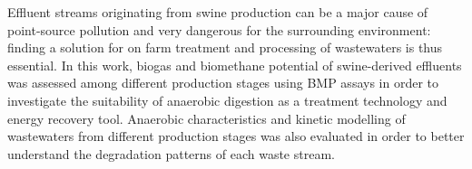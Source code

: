Effluent streams originating from swine production can be a major cause of point-source pollution and very dangerous for the surrounding environment: finding a solution for on farm treatment and processing of wastewaters is thus essential. In this work, biogas and biomethane potential of swine-derived effluents was assessed among different production stages using BMP assays in order to investigate the suitability of anaerobic digestion as a treatment technology and energy recovery tool. Anaerobic characteristics and kinetic modelling of wastewaters from different production stages was also evaluated in order to better understand the degradation patterns of each waste stream.